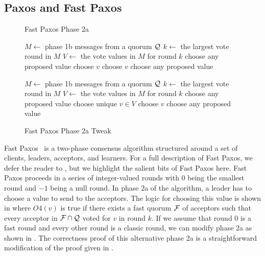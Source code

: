 \subsection{Paxos and Fast Paxos}
\begin{figure}[ht]
  \begin{minipage}[t]{0.48\textwidth}
    \begin{algorithm}[H]
      \caption{Fast Paxos Phase 2a}%
      \begin{algorithmic}[1]
        \State $M \gets$ phase 1b messages from a quorum $\mathcal{Q}$
        \State $k \gets$ the largest vote round in $M$
        \State $V \gets$ the vote values in $M$ for round $k$
          \State choose any proposed value
          \State choose $v$
          \State choose $v$
        \Else{}
          \State choose any proposed value
        \EndIf{}
      \end{algorithmic}
    \end{algorithm}
  \end{minipage}%
  \hspace{0.04\textwidth}%
  \begin{minipage}[t]{0.48\textwidth}
    \begin{algorithm}[H]
      \caption{Fast Paxos Phase 2a Tweak}%
      \begin{algorithmic}[1]
        \State $M \gets$ phase 1b messages from a quorum $\mathcal{Q}$
        \State $k \gets$ the largest vote round in $M$
        \State $V \gets$ the vote values in $M$ for round $k$
          \State choose any proposed value
          \State choose unique $v \in V$
          \State choose $v$
        \Else{}
          \State choose any proposed value
        \EndIf{}
      \end{algorithmic}
    \end{algorithm}
  \end{minipage}
\end{figure}

Fast Paxos~\cite{lamport2006fast} is a two-phase consensus algorithm structured
around a set of clients, leaders, acceptors, and learners. For a full
description of Fast Paxos, we defer the reader to \cite{lamport2006fast}, but
we highlight the salient bits of Fast Paxos here. Fast Paxos proceeds in a
series of integer-valued rounds with $0$ being the smallest round and $-1$
being a null round. In phase 2a of the algorithm, a leader has to choose a
value to send to the acceptors. The logic for choosing this value is shown in
 where $O4(v)$ is true if there exists a fast quorum
$\mathcal{F}$ of acceptors such that every acceptor in $\mathcal{F} \cap
\mathcal{Q}$ voted for $v$ in round $k$.
%
If we assume that round $0$ is a fast round and every other round is a classic
round, we can modify phase 2a as shown in . The
correctness proof of this alternative phase 2a is a straightforward
modification of the proof given in \cite{lamport2006fast}.
